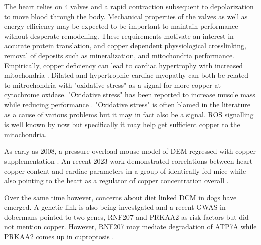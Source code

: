 {The heart relies on 4 valves and a rapid contraction subsequent
to depolarization to move blood through the body. Mechanical
properties of the valves as well as energy efficiency may be expected
to be important to maintain performance without desperate remodelling. 
These requirements motivate an interest in accurate protein
translation, and copper dependent physsiological crosslinking, removal of
deposits such as mineralization, and mitochondria performance. 
Empirically, copper deficiency can lead to cardiac hypertrophy with increased
mitochondria \cite{PMID12539966}.
Dilated and hypertrophic cardiac myopathy can both
be related to mitrochondria with  "oxidative stress"
as a signal for more copper at cytochrome oxidase. "Oxidative stress"
has been reported to increase muscle mass while 
reducing performance \cite{Ahn_Ranjit_Premkumar_Mitochondrial_oxidative_stress_impairs_2019}.
"Oxidative stress" is often blamed in the literature as 
a cause of various problems but it may in fact also be a signal.
ROS signalling is well known by now but specifically
it may help get sufficient copper to the mitochondria.

As early as 2008, a pressure overload mouse model of DEM 
regressed with copper supplementation
\cite{PMC2671677}.
An recent 2023 work demonstrated correlations between heart copper
content and cardiac parameters in a group of identically fed mice
while also pointing to the heart as a regulator of copper concentration
overall \cite{10.3389/fcvm.2023.1089963}.


Over the  same time however, concerns about diet linked
DCM in dogs have emerged.  A genetic link is also being
investgated and a recent GWAS in dobermans pointed to two genes,
RNF207 and PRKAA2 as risk factors \cite{PMC10506233}
 but did not mention copper. 
However, RNF207 may mediate degradation of ATP7A
\cite{Zhao_Zeng_Wang_Targeting_2023}
while PRKAA2 comes up in cuproptosis 
\cite{10.3389/fcell.2022.996307}.

}
